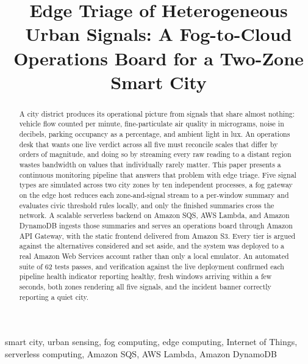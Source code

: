 \documentclass[conference]{IEEEtran}
\begin{document}
\title{Edge Triage of Heterogeneous Urban Signals: A Fog-to-Cloud Operations Board for a Two-Zone Smart City}

\author{
}

\maketitle

\begin{abstract}
A city district produces its operational picture from signals that share almost nothing: vehicle flow counted per minute, fine-particulate air quality in micrograms, noise in decibels, parking occupancy as a percentage, and ambient light in lux. An operations desk that wants one live verdict across all five must reconcile scales that differ by orders of magnitude, and doing so by streaming every raw reading to a distant region wastes bandwidth on values that individually rarely matter. This paper presents a continuous monitoring pipeline that answers that problem with edge triage. Five signal types are simulated across two city zones by ten independent processes, a fog gateway on the edge host reduces each zone-and-signal stream to a per-window summary and evaluates civic threshold rules locally, and only the finished summaries cross the network. A scalable serverless backend on Amazon SQS, AWS Lambda, and Amazon DynamoDB ingests those summaries and serves an operations board through Amazon API Gateway, with the static frontend delivered from Amazon S3. Every tier is argued against the alternatives considered and set aside, and the system was deployed to a real Amazon Web Services account rather than only a local emulator. An automated suite of 62 tests passes, and verification against the live deployment confirmed each pipeline health indicator reporting healthy, fresh windows arriving within a few seconds, both zones rendering all five signals, and the incident banner correctly reporting a quiet city.
\end{abstract}

\begin{IEEEkeywords}
smart city, urban sensing, fog computing, edge computing, Internet of Things, serverless computing, Amazon SQS, AWS Lambda, Amazon DynamoDB
\end{IEEEkeywords}
\end{document}
